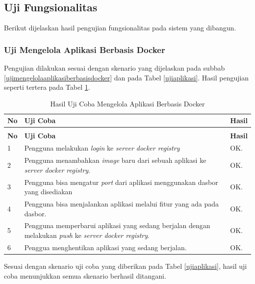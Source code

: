 	\subsection{Uji Fungsionalitas}
    	Berikut dijelaskan hasil pengujian fungsionalitas pada sistem yang dibangun.
        
        \subsubsection{Uji Mengelola Aplikasi Berbasis Docker}
    	Pengujian dilakukan sesuai dengan skenario yang dijelaskan pada subbab \ref{ujimengelolaaplikasiberbasisdocker} dan pada Tabel \ref{ujiaplikasi}. Hasil pengujian seperti tertera pada Tabel \ref{hasilujicobaaplikasi}.
        
        \begin{longtable}{|p{}|p{}|p{}|}					\caption{Hasil Uji Coba Mengelola Aplikasi Berbasis Docker} \label{hasilujicobaaplikasi} \\
					\hline
					\textbf{No} & \textbf{Uji Coba} & \textbf{Hasil} \\ \hline
					\endfirsthead
					\caption[]{Hasil Uji Coba Mengelola Aplikasi Berbasis Docker} \\
					\hline
					\textbf{No} & \textbf{Uji Coba} & \textbf{Hasil} \\ \hline
					\endhead
					\endfoot
					\endlastfoot
					
                    1 & Pengguna melakukan \textit{login} ke \textit{server docker registry} & OK. \\ \hline
                    2 & Pengguna menambahkan \textit{image} baru dari sebuah aplikasi ke \textit{server docker registry}. & OK. \\ \hline
                    3 & Pengguna bisa mengatur \textit{port} dari aplikasi menggunakan dasbor yang disediakan & OK. \\ \hline
                    4 & Pengguna bisa menjalankan aplikasi melalui fitur yang ada pada dasbor. & OK. \\ \hline
					5 & Pengguna memperbarui aplikasi yang sedang berjalan dengan melakukan \textit{push} ke \textit{server docker registry}. & OK. \\ \hline
                    6 & Penggua menghentikan aplikasi yang sedang berjalan. & OK. \\ \hline
				\end{longtable}
    		Sesuai dengan skenario uji coba  yang diberikan pada Tabel \ref{ujiaplikasi}, hasil uji coba menunjukkan semua skenario berhasil ditangani.
        
